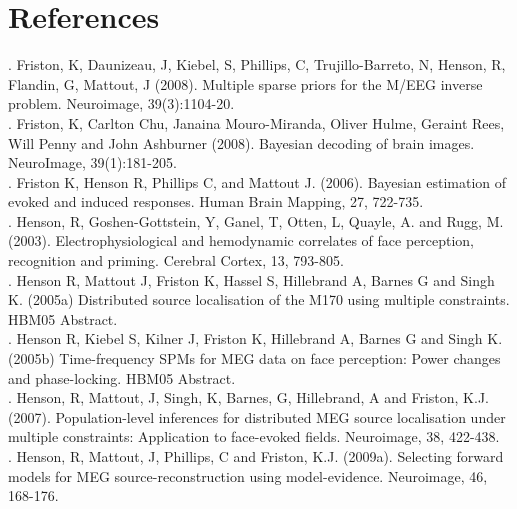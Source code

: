 




\section{References}

. Friston, K, Daunizeau, J, Kiebel, S, Phillips, C, Trujillo-Barreto, N, Henson, R, Flandin, G, Mattout, J (2008). Multiple sparse priors for the M/EEG inverse problem. Neuroimage, 39(3):1104-20.\\

. Friston, K, Carlton Chu, Janaina Mouro-Miranda, Oliver Hulme, Geraint Rees, Will Penny and John Ashburner (2008). Bayesian decoding of brain images. NeuroImage, 39(1):181-205.\\

. Friston K, Henson R, Phillips C, and Mattout J. (2006). Bayesian estimation of evoked and induced responses. Human Brain Mapping, 27, 722-735.\\

. Henson, R, Goshen-Gottstein, Y, Ganel, T, Otten, L, Quayle, A. and Rugg, M. (2003). Electrophysiological and hemodynamic correlates of face perception, recognition and priming. Cerebral Cortex, 13, 793-805.\\

. Henson R, Mattout J, Friston K, Hassel S, Hillebrand A, Barnes G and Singh K. (2005a) Distributed source localisation of the M170 using multiple constraints. HBM05 Abstract.\\

. Henson R, Kiebel S, Kilner J, Friston K, Hillebrand A, Barnes G and Singh K. (2005b) Time-frequency SPMs for MEG data on face perception: Power changes and phase-locking. HBM05 Abstract.\\

. Henson, R, Mattout, J, Singh, K, Barnes, G, Hillebrand, A and Friston, K.J. (2007). Population-level inferences for distributed MEG source localisation under multiple constraints: Application to face-evoked fields. Neuroimage, 38, 422-438.\\

. Henson, R, Mattout, J, Phillips, C and Friston, K.J. (2009a). Selecting forward models for MEG source-reconstruction using model-evidence. Neuroimage, 46, 168-176.\\

